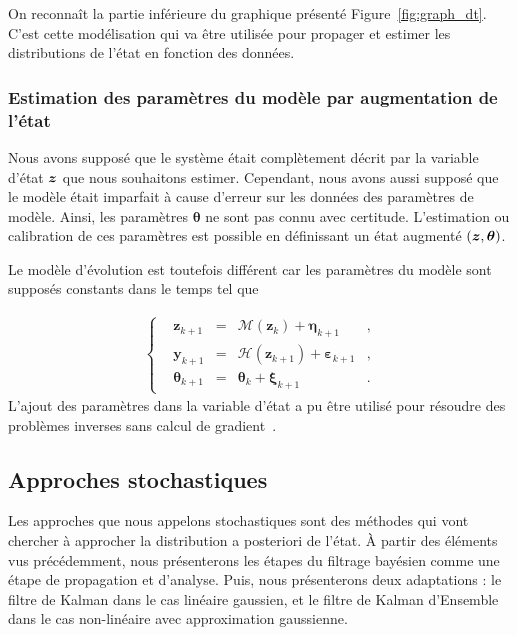 On reconnaît la partie inférieure du graphique présenté Figure~\ref{fig:graph_dt}. C'est cette modélisation qui va être utilisée pour propager et estimer les distributions de l'état en fonction des données.

\subsubsection{Estimation des paramètres du modèle par augmentation de l'état}
Nous avons supposé que le système était complètement décrit par la variable d'état $\bm z$ que nous souhaitons estimer. Cependant, nous avons aussi supposé que le modèle était imparfait à cause d'erreur sur les données des paramètres de modèle. Ainsi, les paramètres $\bm \theta$ ne sont pas connu avec certitude. L'estimation ou calibration de ces paramètres est possible en définissant un état augmenté $(\bm z, \bm \theta)$.

Le modèle d'évolution est toutefois différent car les paramètres du modèle sont supposés constants dans le temps tel que

\begin{gather*}
    \left\{\begin{aligned}
         & \bm{z}_{k+1}      & = & \mathcal{M}(\bm{z}_{k}) + \bm{\eta}_{k+1}          & , \\
         & \bm{y}_{k+1}      & = & \mathcal{H}(\bm{z}_{k+1}) + \bm{\varepsilon}_{k+1} & , \\
         & \bm{\theta}_{k+1} & = & \bm{\theta}_{k} + \bm{\xi}_{k+1}                   & .
    \end{aligned} \right.
\end{gather*}
L'ajout des paramètres dans la variable d'état a pu être utilisé pour résoudre des problèmes inverses sans calcul de gradient~\cite{iglesias_ensemble_2013}.

\subsection{Approches stochastiques}

Les approches que nous appelons stochastiques sont des méthodes qui vont chercher à approcher la distribution a posteriori de l'état. À partir des éléments vus précédemment, nous présenterons les étapes du filtrage bayésien comme une étape de propagation et d'analyse. Puis, nous présenterons deux adaptations : le filtre de Kalman dans le cas linéaire gaussien, et le filtre de Kalman d'Ensemble dans le cas non-linéaire avec approximation gaussienne.

